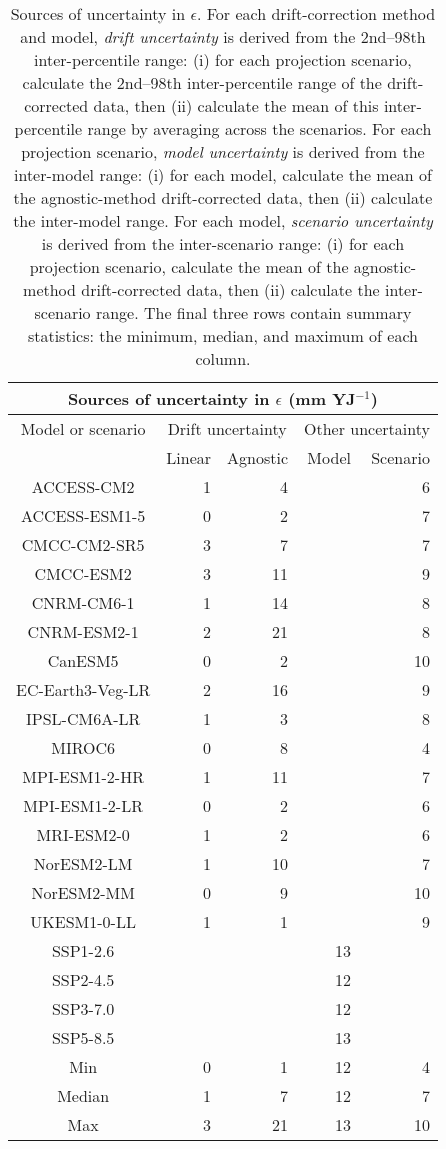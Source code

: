 \begin{table*}[t]
\centering
\caption{Sources of uncertainty in $\epsilon$. For each drift-correction method and model, \emph{drift uncertainty} is derived from the 2nd--98th inter-percentile range: (i) for each projection scenario, calculate the 2nd--98th inter-percentile range of the drift-corrected data, then (ii) calculate the mean of this inter-percentile range by averaging across the scenarios. For each projection scenario, \emph{model uncertainty} is derived from the inter-model range: (i) for each model, calculate the mean of the agnostic-method drift-corrected data, then (ii) calculate the inter-model range. For each model, \emph{scenario uncertainty} is derived from the inter-scenario range: (i) for each projection scenario, calculate the mean of the agnostic-method drift-corrected data, then (ii) calculate the inter-scenario range. The final three rows contain summary statistics: the minimum, median, and maximum of each column.}
\begin{tabular}{c|rr|rr}
\toprule
\multicolumn{5}{c}{Sources of uncertainty in $\epsilon$ (mm YJ$^{-1}$)} \\ 
\midrule
Model or scenario & \multicolumn{2}{c|}{Drift uncertainty} & \multicolumn{2}{c}{Other uncertainty} \\
 & Linear & Agnostic & Model & Scenario \\
\midrule
ACCESS-CM2 & 1 & 4 &  & 6 \\
ACCESS-ESM1-5 & 0 & 2 &  & 7 \\
CMCC-CM2-SR5 & 3 & 7 &  & 7 \\
CMCC-ESM2 & 3 & 11 &  & 9 \\
CNRM-CM6-1 & 1 & 14 &  & 8 \\
CNRM-ESM2-1 & 2 & 21 &  & 8 \\
CanESM5 & 0 & 2 &  & 10 \\
EC-Earth3-Veg-LR & 2 & 16 &  & 9 \\
IPSL-CM6A-LR & 1 & 3 &  & 8 \\
MIROC6 & 0 & 8 &  & 4 \\
MPI-ESM1-2-HR & 1 & 11 &  & 7 \\
MPI-ESM1-2-LR & 0 & 2 &  & 6 \\
MRI-ESM2-0 & 1 & 2 &  & 6 \\
NorESM2-LM & 1 & 10 &  & 7 \\
NorESM2-MM & 0 & 9 &  & 10 \\
UKESM1-0-LL & 1 & 1 &  & 9 \\
SSP1-2.6 &  &  & 13 &  \\
SSP2-4.5 &  &  & 12 &  \\
SSP3-7.0 &  &  & 12 &  \\
SSP5-8.5 &  &  & 13 &  \\
\midrule
Min & 0 & 1 & 12 & 4 \\
Median & 1 & 7 & 12 & 7 \\
Max & 3 & 21 & 13 & 10 \\
\bottomrule
\end{tabular}
\end{table*}
